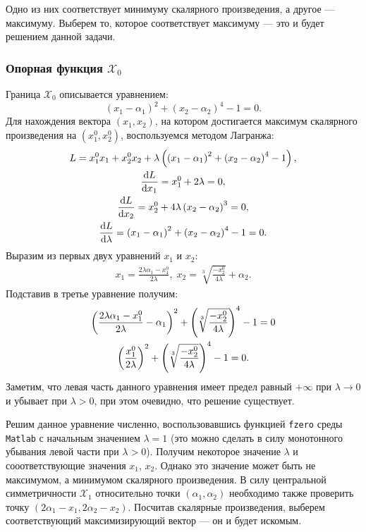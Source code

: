 \documentclass[11pt]{article}
\renewcommand{\d}[1]{\ensuremath{\operatorname{d}\!{#1}}}
\begin{document}
Одно из них соответствует минимуму скалярного произведения, а другое --- максимуму. Выберем то, которое соответствует максимуму --- это и будет решением данной задачи.
\subsubsection{Опорная функция $\mathcal{X}_0$}
Граница $\mathcal{X}_0$ описывается уравнением:
$$
\left( x_1 - \alpha_1 \right)^2 + \left( x_2 - \alpha_2 \right)^4 - 1 = 0.
$$
Для нахождения вектора $\left(x_1, x_2 \right)$, на котором достигается максимум скалярного произведения на $\left(x_1^0, x_2^0 \right)$, воспользуемся методом Лагранжа:
\begin{gather}
L = x_1^0 x_1 + x_2^0 x_2 + \lambda \left( \left( x_1 - \alpha_1 \right)^2 + \left( x_2 - \alpha_2 \right)^4 - 1 \right), \notag \\
\frac{\d{L}}{\d{x_1}} = x_1^0 + 2\lambda = 0, \notag \\
\frac{\d{L}}{\d{x_2}} = x_2^0 + 4\lambda\left(x_2 - \alpha_2\right)^3 = 0, \notag \\
\frac{\d{L}}{\d{\lambda}} = \left( x_1 - \alpha_1 \right)^2 + \left( x_2 - \alpha_2 \right)^4 - 1 = 0. \notag
\end{gather}
Выразим из первых двух уравнений $x_1$ и $x_2$:
\begin{gather}
x_1 = \frac{2\lambda\alpha_1 - x_1^0}{2\lambda}, \; x_2 = \sqrt[3]{\frac{-x_2^0}{4\lambda}} + \alpha_2. \label{SF_X0}
\end{gather}
Подставив в третье уравнение получим:
\begin{gather}
\left( \frac{2\lambda\alpha_1 - x_1^0}{2\lambda} - \alpha_1 \right)^2 + \left( \sqrt[3]{\frac{-x_2^0}{4\lambda}} \right)^4 - 1 = 0 \notag \\
\left( \frac{x_1^0}{2\lambda} \right)^2 + \left( \sqrt[3]{\frac{-x_2^0}{4\lambda}} \right)^4 - 1 = 0. \notag
\end{gather}
Заметим, что левая часть данного уравнения имеет предел равный $+\infty$ при $\lambda \longrightarrow 0$ и убывает при $\lambda > 0$, при этом очевидно, что решение существует.

Решим данное уравнение численно, воспользовавшись функцией \texttt{fzero} среды \texttt{Matlab} с начальным значением $\lambda = 1$ (это можно сделать в силу монотонного убывания левой части при $\lambda > 0$). Получим некоторое значение $\lambda$ и сооответствующие значения $x_1$, $x_2$. Однако это значение может быть не максимумом, а минимумом скалярного произведения. В силу центральной симметричности $\mathcal{X}_1$ относительно точки $\left( \alpha_1, \alpha_2 \right)$ необходимо также проверить точку $\left( 2\alpha_1 - x_1, 2\alpha_2 - x_2 \right)$. Посчитав скалярные произведения, выберем соответствующий максимизирующий вектор --- он и будет искомым.
\end{document}
